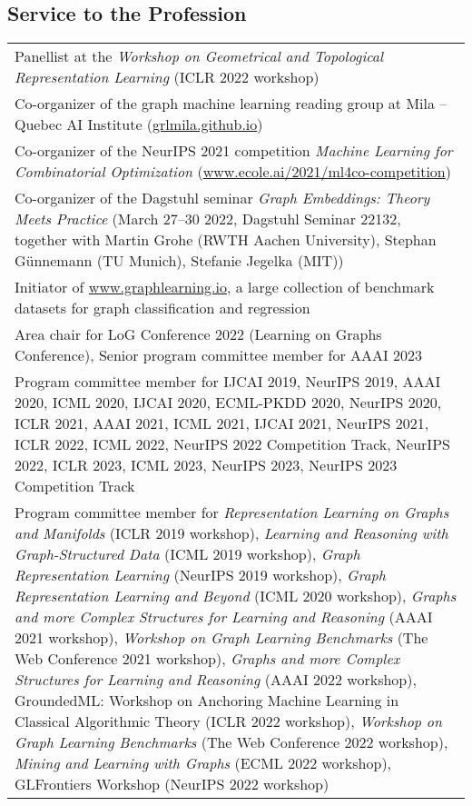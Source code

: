 \documentclass[11pt, a4paper, DIV=14, headings=small]{scrartcl}
\begin{document}
	\subsection*{Service to the Profession}
	\begin{longtabu}{p{14.5cm}}
		Panellist at the \emph{Workshop on Geometrical and Topological Representation Learning} (ICLR 2022 workshop) \\[2em]
		
		Co-organizer of the graph machine learning reading group at Mila -- Quebec AI Institute (\url{grlmila.github.io}) \\[3.em]
		
		Co-organizer of the NeurIPS 2021 competition \emph{Machine Learning for Combinatorial Optimization} (\url{www.ecole.ai/2021/ml4co-competition}) \\[3.em]
		
		Co-organizer of the Dagstuhl seminar \emph{Graph Embeddings: Theory Meets Practice} (March 27–30 2022, Dagstuhl Seminar 22132, together with Martin Grohe (RWTH Aachen University), Stephan Günnemann (TU Munich), Stefanie Jegelka (MIT)) \\[4.em]
		
		Initiator of \url{www.graphlearning.io}, a large collection of benchmark datasets for graph classification and regression \\[3em]
		
		Area chair for LoG Conference 2022 (Learning on Graphs Conference), Senior program committee member for AAAI 2023 \\[3em]
		
		Program committee member for IJCAI 2019, NeurIPS  2019, AAAI 2020, ICML 2020, IJCAI 2020, ECML-PKDD 2020, NeurIPS 2020, ICLR 2021, AAAI 2021, ICML 2021, IJCAI 2021, NeurIPS 2021, ICLR 2022, ICML 2022, NeurIPS 2022 Competition Track, NeurIPS 2022, ICLR 2023, ICML 2023, NeurIPS 2023, NeurIPS 2023 Competition Track \\[5.em]
		
		
		Program committee member for \emph{Representation Learning on Graphs and Manifolds} (ICLR 2019 workshop), \emph{Learning and Reasoning with Graph-Structured Data} (ICML 2019 workshop), \emph{Graph Representation Learning} (NeurIPS 2019 workshop), \emph{Graph Representation Learning and Beyond} (ICML 2020 workshop), \emph{Graphs and more Complex Structures for Learning and Reasoning} (AAAI 2021 workshop), \emph{Workshop on Graph Learning Benchmarks} (The Web Conference 2021 workshop),  \emph{Graphs and more Complex Structures for Learning and Reasoning} (AAAI 2022 workshop), GroundedML: Workshop on Anchoring Machine Learning in Classical Algorithmic Theory (ICLR 2022 workshop), \emph{Workshop on Graph Learning Benchmarks} (The Web Conference 2022 workshop), \emph{Mining and Learning with Graphs} (ECML 2022 workshop), GLFrontiers Workshop (NeurIPS 2022 workshop) \\[34em]
		

\end{longtabu}
\end{document}
